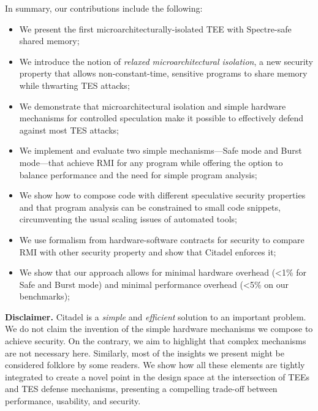 \smallskip\noindent
In summary, our contributions include the following:
\begin{itemize}[leftmargin=*, align=left, itemsep=0ex, topsep=0ex]
\item 
    We present the first microarchitecturally-isolated TEE with Spectre-safe shared memory;
\item 
    We introduce the notion of \emph{relaxed microarchitectural isolation}, a new security property that allows non-constant-time, sensitive programs to share memory while thwarting TES attacks;
\item 
    We demonstrate that microarchitectural isolation and simple hardware mechanisms for controlled speculation make it possible to effectively defend against most TES attacks;
\item 
    We implement and evaluate two simple mechanisms---Safe mode and Burst mode---that achieve RMI for any program while offering the option to balance performance and the need for simple program analysis;
\item 
    We show how to compose code with different speculative security properties and that program analysis can be constrained to small code snippets, circumventing the usual scaling issues of automated tools;
\item
    We use formalism from hardware-software contracts for security to compare RMI with other security property and show that Citadel enforces it;
\item
    We show that our approach allows for minimal hardware overhead (<1\% for Safe and Burst mode) and minimal performance overhead (<5\% on our benchmarks);
\end{itemize}


\bigskip
\noindent\textbf{Disclaimer.} Citadel is a \emph{simple} and \emph{efficient} solution to an important problem.
We do not claim the invention of the simple hardware mechanisms we compose to achieve security.
On the contrary, we aim to highlight that complex mechanisms are not necessary here.
Similarly, most of the insights we present might be considered folklore by some readers.
We show how all these elements are tightly integrated to create a novel point in the design space at the intersection of TEEs and TES defense mechanisms, presenting a compelling trade-off between performance, usability, and security.